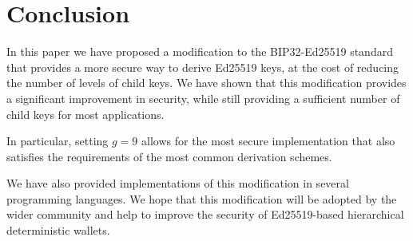 \documentclass[12pt, a4paper, twocolumn]{article}
\begin{document}
\section{Conclusion}

In this paper we have proposed a modification to the BIP32-Ed25519 standard that provides a more secure way to derive Ed25519 keys, at the cost of reducing the number of levels of child keys. We have shown that this modification provides a significant improvement in security, while still providing a sufficient number of child keys for most applications.

In particular, setting $g=9$ allows for the most secure implementation that also satisfies the requirements of the most common derivation schemes.

We have also provided implementations of this modification in several programming languages. We hope that this modification will be adopted by the wider community and help to improve the security of Ed25519-based hierarchical deterministic wallets.


\nocite{*}


\end{document}
